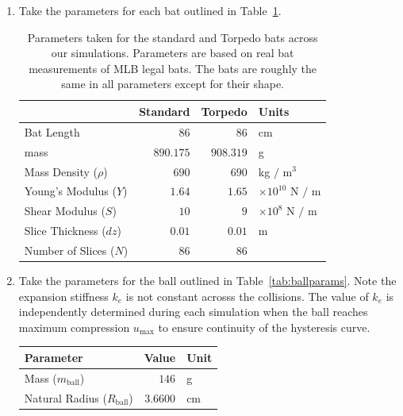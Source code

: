 \documentclass[linenumbers]{aastex7}
\newcommand{\ball}{_\mathrm{ball}}
\begin{document}
\begin{enumerate}
	\item Take the parameters for each bat outlined in Table~\ref{tab:batparams}.
	      \begin{table}[h]
		      \centering
		      \begin{tabular}{|lrr|l|} \toprule     & \textbf{Standard} & \textbf{Torpedo} & \textbf{Units}           \\ \hline
               Bat Length             & $86 $             & $86$             & cm                       \\
               mass                   & $890.175$         & $908.319$        & g                        \\
               Mass Density ($\rho$)  & $690$             & $690$            & kg $/$ m$^3$             \\
               Young's Modulus ($Y$)  & $1.64$            & $1.65$           & $\times 10^{10}$ N $/$ m \\
               Shear Modulus ($S$)    & $10$              & $9$              & $\times 10^{8}$ N $/ $ m \\
               Slice Thickness ($dz$) & $0.01$            & $0.01$           & m                        \\
               Number of Slices ($N$) & $ 86$             & $86$             &                          \\\hline
		      \end{tabular}
		      \caption{Parameters taken for the standard and Torpedo bats across our simulations. Parameters are based on real bat measurements of MLB legal bats. The bats are roughly the same in all parameters except for their shape.}
		      \label{tab:batparams}
	      \end{table}
	\item Take the parameters for the ball outlined in Table~\ref{tab:ballparams}. Note the expansion stiffness $k_e$ is not constant acrosss the collisions. The value of $k_e$ is independently determined during each simulation when the ball reaches maximum compression $u_\mathrm{max}$ to ensure continuity of the hysteresis curve.
	      \begin{table}[h]
		      \centering
		      \begin{tabular}{|lr|l|} \toprule \textbf{Parameter} & \textbf{Value} & \textbf{Unit} \\\hline  Mass ($m\ball$) & $146$ & g
               \\ Natural Radius ($R\ball$) & $3.6600$ & cm                \\

\end{tabular}
\end{table}
\end{enumerate}
\end{document}

